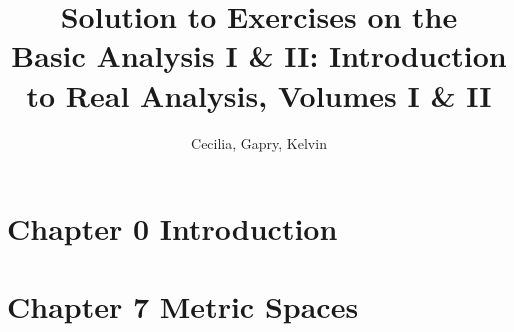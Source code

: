 \documentclass{article}
\title{Solution to Exercises on the \\Basic Analysis I \& II: Introduction to Real Analysis, Volumes I \& II}
\author{Cecilia, Gapry, Kelvin}
\begin{document}
\maketitle

\section*{Chapter 0 Introduction}


\section*{Chapter 7 Metric Spaces}


\end{document}
